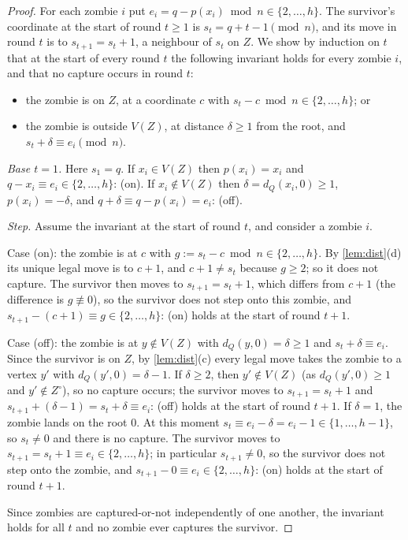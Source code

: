 \documentclass[11pt,a4paper]{article}
\theoremstyle{plain}
\theoremstyle{definition}
\theoremstyle{remark}
\providecommand{\tightlist}{\setlength{\itemsep}{0pt}\setlength{\parskip}{0pt}}
\newcommand{\dist}{d}
\begin{document}
\label{pf:rot}
\lemrot*
\begin{proof}
For each zombie $i$ put $e_i=q-p(x_i)\bmod n\in\{2,\dots,h\}$. The survivor's coordinate at the start of round $t\ge1$ is $s_t=q+t-1\pmod n$, and its move in round $t$ is to $s_{t+1}=s_t+1$, a neighbour of $s_t$ on $Z$. We show by induction on $t$ that at the start of every round $t$ the following invariant holds for every zombie $i$, and that no capture occurs in round $t$:
\begin{itemize}\tightlist
\item[(on)] the zombie is on $Z$, at a coordinate $c$ with $s_t-c\bmod n\in\{2,\dots,h\}$; or
\item[(off)] the zombie is outside $V(Z)$, at distance $\delta\ge1$ from the root, and $s_t+\delta\equiv e_i\pmod n$.
\end{itemize}
\emph{Base $t=1$.} Here $s_1=q$. If $x_i\in V(Z)$ then $p(x_i)=x_i$ and $q-x_i\equiv e_i\in\{2,\dots,h\}$: (on). If $x_i\notin V(Z)$ then $\delta=\dist_Q(x_i,0)\ge1$, $p(x_i)=-\delta$, and $q+\delta\equiv q-p(x_i)=e_i$: (off).

\emph{Step.} Assume the invariant at the start of round $t$, and consider a zombie $i$.

Case (on): the zombie is at $c$ with $g:=s_t-c\bmod n\in\{2,\dots,h\}$. By \cref{lem:dist}(d) its unique legal move is to $c+1$, and $c+1\ne s_t$ because $g\ge2$; so it does not capture. The survivor then moves to $s_{t+1}=s_t+1$, which differs from $c+1$ (the difference is $g\not\equiv0$), so the survivor does not step onto this zombie, and $s_{t+1}-(c+1)\equiv g\in\{2,\dots,h\}$: (on) holds at the start of round $t+1$.

Case (off): the zombie is at $y\notin V(Z)$ with $\dist_Q(y,0)=\delta\ge1$ and $s_t+\delta\equiv e_i$. Since the survivor is on $Z$, by \cref{lem:dist}(c) every legal move takes the zombie to a vertex $y'$ with $\dist_Q(y',0)=\delta-1$. If $\delta\ge2$, then $y'\notin V(Z)$ (as $\dist_Q(y',0)\ge1$ and $y'\notin Z^\circ$), so no capture occurs; the survivor moves to $s_{t+1}=s_t+1$ and $s_{t+1}+(\delta-1)=s_t+\delta\equiv e_i$: (off) holds at the start of round $t+1$. If $\delta=1$, the zombie lands on the root $0$. At this moment $s_t\equiv e_i-\delta=e_i-1\in\{1,\dots,h-1\}$, so $s_t\ne0$ and there is no capture. The survivor moves to $s_{t+1}=s_t+1\equiv e_i\in\{2,\dots,h\}$; in particular $s_{t+1}\ne0$, so the survivor does not step onto the zombie, and $s_{t+1}-0\equiv e_i\in\{2,\dots,h\}$: (on) holds at the start of round $t+1$.

Since zombies are captured-or-not independently of one another, the invariant holds for all $t$ and no zombie ever captures the survivor.
\end{proof}
\end{document}
